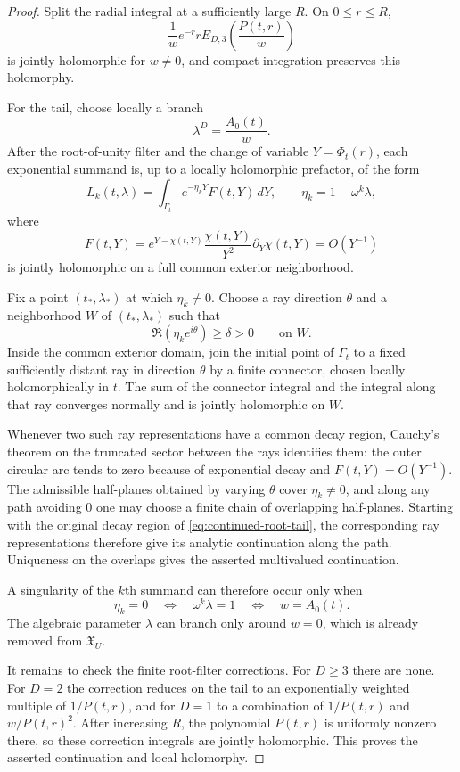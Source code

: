 \documentclass[11pt]{article}
\numberwithin{equation}{section}
\theoremstyle{definition}
\theoremstyle{remark}
\begin{document}
\begin{proof}
Split the radial integral at a sufficiently large $R$.  On $0\le r\le R$,
\[
  \frac1w e^{-r}rE_{D,3}\!\left(\frac{P(t,r)}w\right)
\]
is jointly holomorphic for $w\ne0$, and compact integration preserves this
holomorphy.

For the tail, choose locally a branch
\[
  \lambda^D=\frac{A_0(t)}w.
\]
After the root-of-unity filter and the change of variable $Y=\Phi_t(r)$,
each exponential summand is, up to a locally holomorphic prefactor, of the
form
\begin{equation}\label{eq:continued-root-tail}
  L_k(t,\lambda)
  =\int_{\Gamma_t}e^{-\eta_kY}F(t,Y)\,dY,
  \qquad
  \eta_k=1-\omega^k\lambda,
\end{equation}
where
\[
  F(t,Y)=e^{Y-\chi(t,Y)}
  \frac{\chi(t,Y)}{Y^2}\partial_Y\chi(t,Y)=O(Y^{-1})
\]
is jointly holomorphic on a full common exterior neighborhood.

Fix a point $(t_*,\lambda_*)$ at which $\eta_k\ne0$.  Choose a ray
direction $\theta$ and a neighborhood $W$ of $(t_*,\lambda_*)$ such that
\[
  \Re(\eta_ke^{i\theta})\ge\delta>0
  \qquad\text{on }W.
\]
Inside the common exterior domain, join the initial point of $\Gamma_t$ to a
fixed sufficiently distant ray in direction $\theta$ by a finite connector,
chosen locally holomorphically in $t$.  The sum of the connector integral and
the integral along that ray converges normally and is jointly holomorphic on
$W$.

Whenever two such ray representations have a common decay region, Cauchy's
theorem on the truncated sector between the rays identifies them: the outer
circular arc tends to zero because of exponential decay and
$F(t,Y)=O(Y^{-1})$.  The admissible half-planes obtained by varying $\theta$
cover $\eta_k\ne0$, and along any path avoiding $0$ one may choose a finite
chain of overlapping half-planes.  Starting with the original decay region
of \eqref{eq:continued-root-tail}, the corresponding ray representations
therefore give its analytic continuation along the path.  Uniqueness on the
overlaps gives the asserted multivalued continuation.

A singularity of the $k$th summand can therefore occur only when
\[
  \eta_k=0
  \quad\Longleftrightarrow\quad
  \omega^k\lambda=1
  \quad\Longleftrightarrow\quad
  w=A_0(t).
\]
The algebraic parameter $\lambda$ can branch only around $w=0$, which is
already removed from $\mathfrak X_U$.

It remains to check the finite root-filter corrections.  For $D\ge3$ there
are none.  For $D=2$ the correction reduces on the tail to an exponentially
weighted multiple of $1/P(t,r)$, and for $D=1$ to a combination of
$1/P(t,r)$ and $w/P(t,r)^2$.  After increasing $R$, the polynomial $P(t,r)$
is uniformly nonzero there, so these correction integrals are jointly
holomorphic.  This proves the asserted continuation and local holomorphy.
\end{proof}
\end{document}
